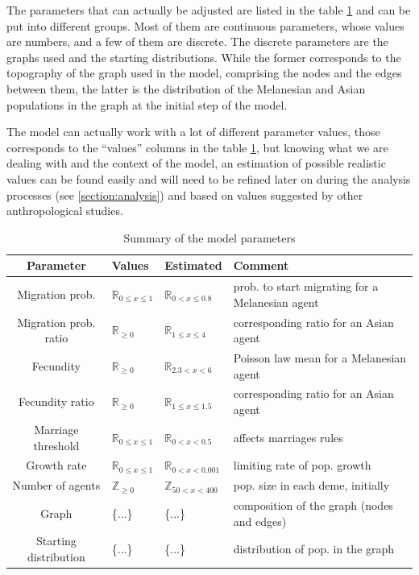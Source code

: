 \documentclass[a4paper,12pt]{report}
\begin{document}
The parameters that can actually be adjusted are listed in the table \ref{parameters} and can be put into different groups. Most of them are continuous parameters, whose values are numbers, and a few of them are discrete. The discrete parameters are the graphs used and the starting distributions. While the former corresponds to the topography of the graph used in the model, comprising the nodes and the edges between them, the latter is the distribution of the Melanesian and Asian populations in the graph at the initial step of the model.

The model can actually work with a lot of different parameter values, those corresponds to the “values” columns in the table \ref{parameters}, but knowing what we are dealing with and the context of the model, an estimation of possible realistic values can be found easily and will need to be refined later on during the analysis processes (see \ref{section:analysis}) and based on values suggested by other anthropological studies.

\begin{table}
	\hspace*{-1.75cm}
	\begin{tabular}{|c|l|l|l|}
		\hline
 		Parameter & Values & Estimated & Comment \\ \hline
        Migration prob. & $\mathbb{R}_{0 \leq x \leq 1}$ & $\mathbb{R}_{0 < x \leq 0.8}$ & prob. to start migrating for a Melanesian agent \\ \hline
        Migration prob. ratio & $\mathbb{R}_{\geq 0}$ & $\mathbb{R}_{1 \leq x \leq 4}$ & corresponding ratio for an Asian agent \\ \hline
        Fecundity & $\mathbb{R}_{\geq 0}$ & $\mathbb{R}_{2.3 < x < 6}$ & Poisson law mean for a Melanesian agent \\ \hline
        Fecundity ratio & $\mathbb{R}_{\geq 0}$ & $\mathbb{R}_{1 \leq x \leq 1.5}$ & corresponding ratio for an Asian agent \\ \hline
        Marriage threshold & $\mathbb{R}_{0 \leq x \leq 1}$ & $\mathbb{R}_{0 < x < 0.5}$ & affects marriages rules \\ \hline
        Growth rate & $\mathbb{R}_{0 \leq x \leq 1}$ & $\mathbb{R}_{0 < x < 0.001}$ & limiting rate of pop. growth \\ \hline
        Number of agents & $\mathbb{Z}_{\geq 0}$ & $\mathbb{Z}_{50 < x < 400}$ & pop. size in each deme, initially \\ \hline
        Graph & \{...\} & \{...\} & composition of the graph (nodes and edges) \\ \hline
        Starting distribution & \{...\} & \{...\} & distribution of pop. in the graph \\ \hline
	\end{tabular}
	\caption{Summary of the model parameters}
	\label{parameters}
\end{table}
\end{document}
